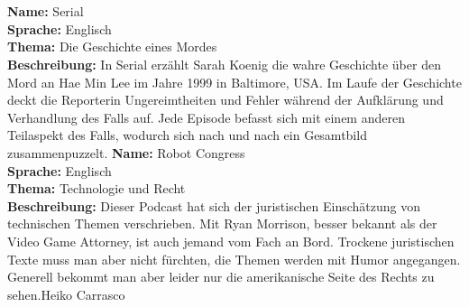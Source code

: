 {    \vfill~\\\columnbreak\\
    \textbf{Name: }Serial\\
    \textbf{Sprache: }Englisch\\
    \textbf{Thema: }Die Geschichte eines Mordes\\
    \textbf{Beschreibung: }In Serial erzählt Sarah Koenig die wahre Geschichte über den Mord an Hae Min Lee im Jahre 1999 in Baltimore, USA. Im Laufe der Geschichte deckt die Reporterin Ungereimtheiten und
    Fehler während der Aufklärung und Verhandlung des Falls auf. Jede Episode befasst sich mit einem anderen Teilaspekt des Falls, wodurch sich nach und nach ein Gesamtbild zusammenpuzzelt.
    \vfill\columnbreak
    \textbf{Name: }Robot Congress\\
    \textbf{Sprache: }Englisch\\
    \textbf{Thema: }Technologie und Recht\\
    \textbf{Beschreibung: } Dieser Podcast hat sich der juristischen Einschätzung von technischen Themen verschrieben. Mit Ryan Morrison, besser bekannt als der Video Game Attorney, ist auch jemand vom Fach an Bord. Trockene juristischen Texte muss man aber nicht fürchten, die Themen werden mit Humor angegangen. Generell bekommt man aber leider nur die amerikanische Seite des Rechts zu sehen.}{Heiko Carrasco}
